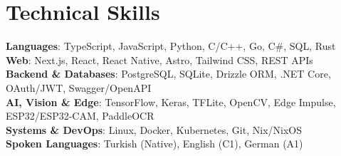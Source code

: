 \documentclass[letterpaper,11pt]{article}
\begin{document}
\section{Technical Skills}
 \begin{itemize}[leftmargin=0.15in, label={}]
    \small{\item{
     \textbf{Languages}{: TypeScript, JavaScript, Python, C/C++, Go, C\#, SQL, Rust} \\
\textbf{Web}{: Next.js, React, React Native, Astro, Tailwind CSS, REST APIs} \\
\textbf{Backend \& Databases}{: PostgreSQL, SQLite, Drizzle ORM, .NET Core, OAuth/JWT, Swagger/OpenAPI} \\
\textbf{AI, Vision \& Edge}{: TensorFlow, Keras, TFLite, OpenCV, Edge Impulse, ESP32/ESP32-CAM, PaddleOCR} \\
\textbf{Systems \& DevOps}{: Linux, Docker, Kubernetes, Git, Nix/NixOS} \\
\textbf{Spoken Languages}{: Turkish (Native), English (C1), German (A1)}
    }}
 \end{itemize}


\end{document}
